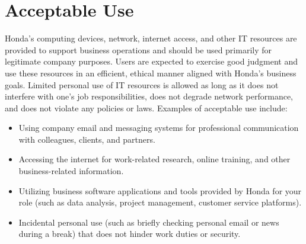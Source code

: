\section{Acceptable Use}
Honda's computing devices, network, internet access, and other IT resources are provided to support business operations and should be used primarily for legitimate company purposes. Users are expected to exercise good judgment and use these resources in an efficient, ethical manner aligned with Honda's business goals. Limited personal use of IT resources is allowed as long as it does not interfere with one's job responsibilities, does not degrade network performance, and does not violate any policies or laws. Examples of acceptable use include:
\begin{itemize}
    \item Using company email and messaging systems for professional communication with colleagues, clients, and partners.
    \item Accessing the internet for work-related research, online training, and other business-related information.
    \item Utilizing business software applications and tools provided by Honda for your role (such as data analysis, project management, customer service platforms).
    \item Incidental personal use (such as briefly checking personal email or news during a break) that does not hinder work duties or security.
\end{itemize}

